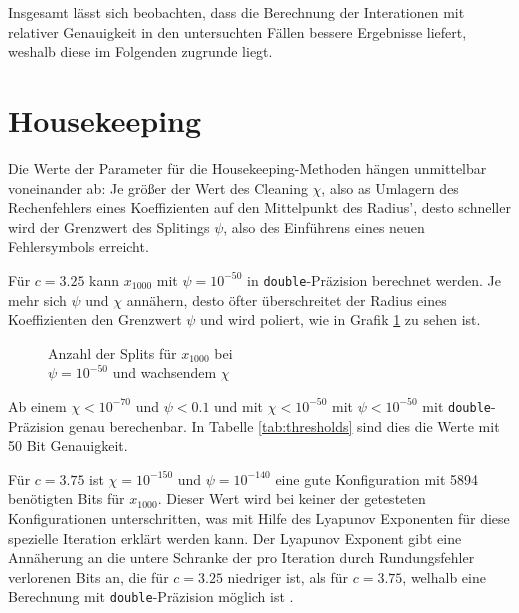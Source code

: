 Insgesamt lässt sich beobachten, dass die Berechnung der Interationen mit relativer Genauigkeit in den untersuchten Fällen bessere Ergebnisse liefert, weshalb diese im Folgenden zugrunde liegt.

\section{Housekeeping}
\label{sec:housekeeping}
Die Werte der Parameter für die Housekeeping-Methoden hängen unmittelbar voneinander ab: Je größer der Wert des Cleaning $\chi$, also as Umlagern des Rechenfehlers eines Koeffizienten auf den Mittelpunkt des Radius', desto schneller wird der Grenzwert des Splitings $\psi$, also des Einführens eines neuen Fehlersymbols erreicht.

Für $c=3.25$ kann $x_{1000}$ mit $\psi = 10^{-50}$ in \verb+double+-Präzision berechnet werden. Je mehr sich $\psi$ und $\chi$ annähern, desto öfter überschreitet der Radius eines Koeffizienten den Grenzwert $\psi$ und wird poliert, wie in Grafik \ref{fig:polish} zu sehen ist.

\begin{figure}[ht]
    \centering
    \caption[Grenzwertvergleich]{Anzahl der Splits für $x_{1000}$ bei \\ $\psi = 10^{-50}$ und wachsendem $\chi$}
    \label{fig:polish}
\end{figure}


Ab einem $\chi < 10^{-70}$ und $\psi < 0.1$ und mit $\chi < 10^{-50}$ mit $\psi < 10^{-50}$ mit \verb+double+-Präzision genau berechenbar. In Tabelle \ref{tab:thresholds} sind dies die Werte mit 50 Bit Genauigkeit.

Für $c = 3.75$ ist $\chi=10^{-150}$ und $\psi=10^{-140}$ eine gute Konfiguration mit 5894 benötigten Bits für $x_{1000}$. Dieser Wert wird bei keiner der getesteten Konfigurationen unterschritten, was mit Hilfe des Lyapunov Exponenten für diese spezielle Iteration erklärt werden kann. Der Lyapunov Exponent gibt eine Annäherung an die untere Schranke der pro Iteration durch Rundungsfehler verlorenen Bits an, die für $c=3.25$ niedriger ist, als für $c=3.75$, welhalb eine Berechnung mit \verb+double+-Präzision möglich ist \cite{DBLP:spandl}.

